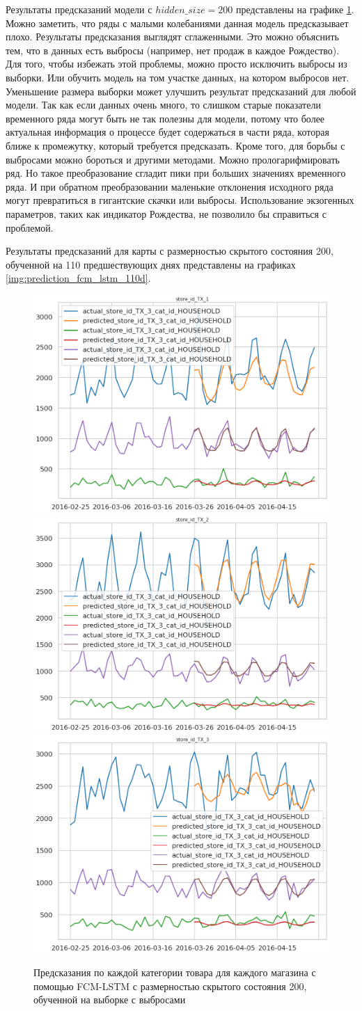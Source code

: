 Результаты предсказаний модели с $ hidden\_size = 200 $ представлены на графике \ref{img:prediction_fcm_lstm}.
Можно заметить, что ряды с малыми колебаниями данная модель предсказывает плохо.
Результаты предсказания выглядят сглаженными. Это можно объяснить тем, что
в данных есть выбросы (например, нет продаж в каждое Рождество).
Для того, чтобы избежать этой проблемы, можно просто исключить  выбросы из выборки.
Или обучить модель на том участке данных, на котором выбросов нет.
Уменьшение размера выборки может улучшить результат предсказаний для любой модели.
Так как если данных очень много, то слишком старые показатели временного ряда
могут быть не так полезны для модели, потому что более актуальная информация
о процессе будет содержаться в части ряда, которая ближе к промежутку, который
требуется предсказать.
Кроме того, для борьбы с выбросами можно бороться и другими методами.
Можно прологарифмировать ряд. Но такое преобразование сгладит пики при больших значениях
временного ряда. И при обратном преобразовании маленькие отклонения исходного ряда
могут превратиться в гигантские скачки или выбросы.
Использование экзогенных параметров, таких как индикатор Рождества, не позволило бы
справиться с проблемой.

Результаты предсказаний для карты с размерностью скрытого состояния 200, обученной на 110 предшествующих днях
представлены на графиках \ref{img:prediction_fcm_lstm_110d}.

\def\figurename{Рис}
\begin{figure}[t]
	\centering
	\includegraphics[width=0.25\columnwidth]{./img/fcm_lstm_tx1.png}
	\includegraphics[width=0.25\columnwidth]{./img/fcm_lstm_tx2.png}
	\includegraphics[width=0.25\columnwidth]{./img/fcm_lstm_tx3.png}
	\caption{Предсказания по каждой категории товара для каждого магазина с помощью FCM-LSTM с размерностью скрытого состояния 200, обученной на выборке с выбросами}
	\label{img:prediction_fcm_lstm}
\end{figure}


